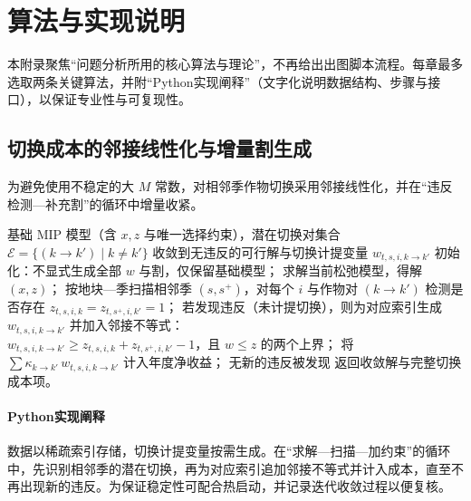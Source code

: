 \section{算法与实现说明}
\noindent 本附录聚焦“问题分析所用的核心算法与理论”，不再给出出图脚本流程。每章最多选取两条关键算法，并附“Python实现阐释”（文字化说明数据结构、步骤与接口），以保证专业性与可复现性。

\subsection{切换成本的邻接线性化与增量割生成}
为避免使用不稳定的大 $M$ 常数，对相邻季作物切换采用邻接线性化，并在“违反检测—补充割”的循环中增量收紧。
\begin{algorithm}[H]
  \caption{切换成本的邻接线性化与增量割生成}
  \label{lst:switch-linearization}
  \label{lst:revenue-curve}
  \begin{algorithmic}[1]
    \Require 基础 MIP 模型（含 $x,z$ 与唯一选择约束），潜在切换对集合 $\mathcal{E} = \{(k\to k')\mid k\ne k'\}$
    \Ensure 收敛到无违反的可行解与切换计提变量 $w_{t,s,i,k\to k'}$
    \State 初始化：不显式生成全部 $w$ 与割，仅保留基础模型；
    \Repeat
      \State 求解当前松弛模型，得解 $(x,z)$；
      \State 按地块—季扫描相邻季 $(s,s^+)$，对每个 $i$ 与作物对 $(k\to k')$ 检测是否存在 $z_{t,s,i,k}=z_{t,s^+,i,k'}=1$；
      \State 若发现违反（未计提切换），则为对应索引生成 $w_{t,s,i,k\to k'}$ 并加入邻接不等式：\\
            $w_{t,s,i,k\to k'} \ge z_{t,s,i,k} + z_{t,s^+,i,k'} - 1$，且 $w\le z$ 的两个上界；
      \State 将 $\sum \kappa_{k\to k'}\,w_{t,s,i,k\to k'}$ 计入年度净收益；
    \Until 无新的违反被发现
    \State 返回收敛解与完整切换成本项。
  \end{algorithmic}
\end{algorithm}
\paragraph{Python实现阐释}
数据以稀疏索引存储，切换计提变量按需生成。在“求解—扫描—加约束”的循环中，先识别相邻季的潜在切换，再为对应索引追加邻接不等式并计入成本，直至不再出现新的违反。为保证稳定性可配合热启动，并记录迭代收敛过程以便复核。

\newpage
\begin{center}
\begin{minipage}[t][\dimexpr\textheight-1em\relax]{0.98\linewidth}

\end{minipage}
\end{center}

